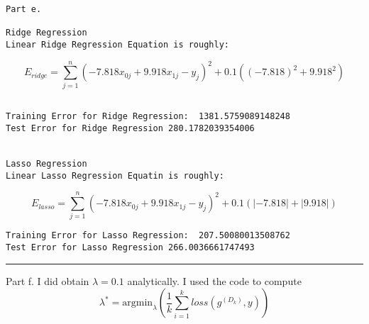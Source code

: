 \documentclass[11pt]{article}
\begin{document}
    \begin{Verbatim}[commandchars=\\\{\}]
Part e.

Ridge Regression
Linear Ridge Regression Equation is roughly:
    \end{Verbatim}

    $$E_{ridge}=\sum_{j=1}^n(-7.818x_{0j}+9.918x_{1j}-y_j)^2+0.1((-7.818)^2+9.918^2)$$

    
    \begin{Verbatim}[commandchars=\\\{\}]

Training Error for Ridge Regression:  1381.5759089148248
Test Error for Ridge Regression 280.1782039354006


Lasso Regression
Linear Lasso Regression Equatin is roughly:
    \end{Verbatim}

    $$E_{lasso}=\sum_{j=1}^n(-7.818x_{0j}+9.918x_{1j}-y_j)^2+0.1(|-7.818|+|9.918|)$$

    
    \begin{Verbatim}[commandchars=\\\{\}]
Training Error for Lasso Regression:  207.50080013508762
Test Error for Lasso Regression 266.0036661747493
    \end{Verbatim}

    \begin{center}\rule{0.5\linewidth}{\linethickness}\end{center}

Part f. I did obtain \(\lambda=0.1\) analytically. I used the code to
compute
\[\lambda^*=\text{argmin}_\lambda\left(\dfrac{1}{k}\sum_{i=1}^kloss(g^{(D_k)},y)\right)\]
\end{document}
